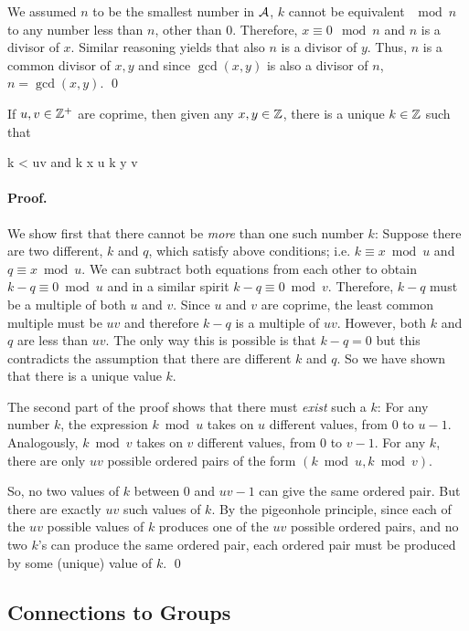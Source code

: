 We assumed $n$ to be the smallest number in $\mathcal{A}$, $k$ cannot be equivalent $\mod n$ to any number less than $n$, other than $0$. Therefore, $x \equiv 0 \mod n$ and $n$ is a divisor of $x$. Similar reasoning yields that also $n$ is a divisor of $y$. Thus, $n$ is a common divisor of $x,y$ and since $\gcd(x,y)$ is also a divisor of $n$, $n = \gcd(x,y)$. \qed


\begin{theorem}
If $u,v \in \mathbb{Z}^{+}$ are coprime, then given any $x,y \in \mathbb{Z}$, there is a unique $k \in \mathbb{Z}$ such that

 \leq k < uv
\eee
%
and
\bee
k \equiv x \bmod u \qquad k \equiv y \bmod v
\eee
\end{theorem}

\paragraph{Proof.} 
We show first that there cannot be \emph{more} than one such number $k$: Suppose there are two different, $k$ and $q$, which satisfy above conditions; i.e. $k \equiv x \bmod u$ and $q \equiv x \bmod u$. We can subtract both equations from each other to obtain $k - q \equiv 0 \bmod u$ and in a similar spirit $k - q \equiv 0 \bmod v$. Therefore, $k-q$ must be a multiple of both $u$ and $v$. Since $u$ and $v$ are coprime, the least common multiple must be $uv$ and therefore $k-q$ is a multiple of $uv$. However, both $k$ and $q$ are less than $uv$. The only way this is possible is that $k-q=0$ but this contradicts the assumption that there are different $k$ and $q$. So we have shown that there is a unique value $k$.

The second part of the proof shows that there must \emph{exist} such a $k$: For any number $k$, the expression $k \bmod u$ takes on $u$ different values, from $0$ to $u-1$. Analogously, $k \bmod v$ takes on $v$ different values, from $0$ to $v-1$. For any $k$, there are only $uv$ possible ordered pairs of the form $(k \bmod u, k \bmod v)$.

So, no two values of $k$ between $0$ and $uv-1$ can give the same ordered pair. But there are exactly $uv$ such values of $k$. By the pigeonhole principle, since each of the $uv$ possible values of $k$ produces one of the $uv$ possible ordered pairs, and no two $k$’s can produce the same ordered pair, each ordered pair must be produced by some (unique) value of $k$. \qed


\subsection{Connections to Groups}


